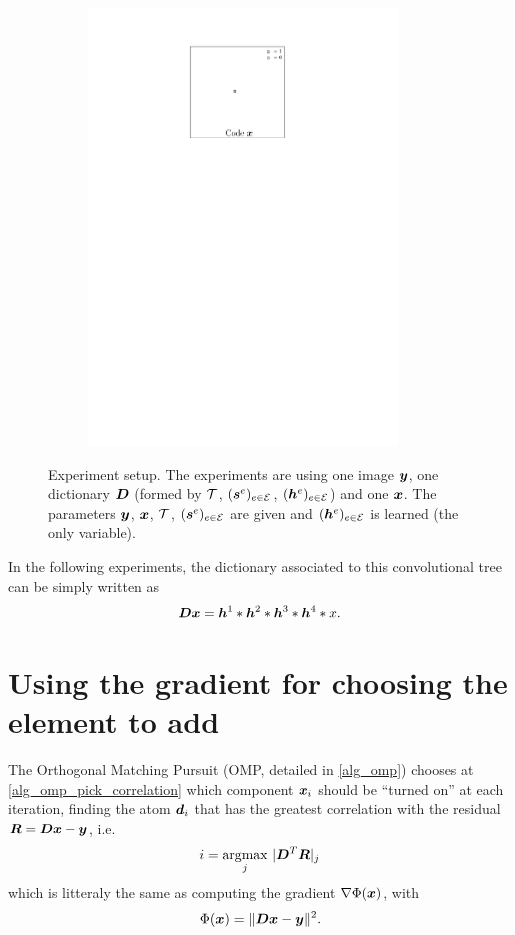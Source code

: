 \begin{figure}[!ht]
\begin{subfigure}[b]{0.32\textwidth}
	\includegraphics[width=0.9\textwidth]{figures/xp_explain/code.pdf}
	\caption{}
\end{subfigure}
\caption{Experiment setup. The experiments are using one image $\bm{y}$, one dictionary $\bm{D}$ (formed by $\mathcal T$, $(\bm{s}^e)_{e \in \mathcal E}$, $(\bm{h}^e)_{e \in \mathcal E}$) and one $\bm{x}$. The parameters $\bm{y}$, $\bm{x}$, $\mathcal T$, $(\bm{s}^e)_{e \in \mathcal E}$ are given and $(\bm{h}^e)_{e \in \mathcal E}$ is learned (the only variable).}\label{fig_xp_explain}
\end{figure}
In the following experiments, the dictionary associated to this convolutional tree can be simply written as 
$$\bm{D}\bm{x} = \bm{h}^1 * \bm{h}^2 * \bm{h}^3 * \bm{h}^4 * x.$$

\section{Using the gradient for choosing the element to add}

The Orthogonal Matching Pursuit (\ac{OMP}, detailed in \cref{alg_omp}) chooses at \cref{alg_omp_pick_correlation} which component $\bm{x}_i$ should be “turned on” at each iteration, finding the atom $\bm{d}_i$ that has the greatest correlation with the residual $\bm{R} = \bm{D}\bm{x} - \bm{y}$, i.e.
$$ i = \underset{j}{\operatorname*{\arg\!\max}} ~ | \bm{D}^T \bm{R} |_j $$
which is litteraly the same as computing the gradient $\nabla \Phi(\bm{x})$, with $$\Phi(\bm{x}) = \lVert \bm{D}\bm{x} - \bm{y} \rVert^2.$$

